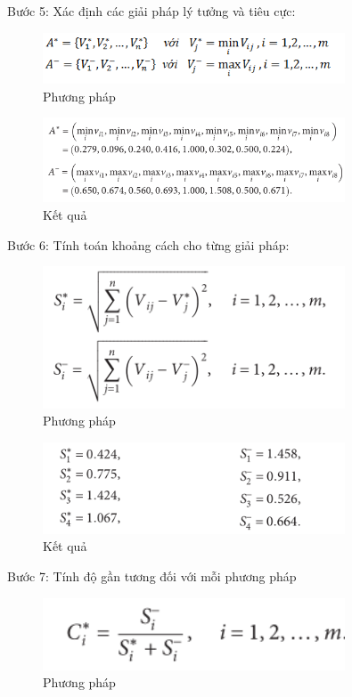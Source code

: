 \documentclass{article}
\begin{document}
Bước 5: Xác định các giải pháp lý tưởng và tiêu cực:
\begin{figure}[H]
    \centering
    \includegraphics[width=0.8\textwidth]{o15.png}
    \caption{Phương pháp}
    \label{dongco}
\end{figure}
\begin{figure}[H]
    \centering
    \includegraphics[width=0.8\textwidth]{o16.png}
    \caption{Kết quả}
    \label{dongco}
\end{figure}
Bước 6: Tính toán khoảng cách cho từng giải pháp:
\begin{figure}[H]
    \centering
    \includegraphics[width=0.8\textwidth]{o17.png}
    \caption{Phương pháp}
    \label{dongco}
\end{figure}
\begin{figure}[H]
    \centering
    \includegraphics[width=0.8\textwidth]{o18.png}
    \caption{Kết quả}
    \label{dongco}
\end{figure}
Bước 7: Tính độ gần tương đối với mỗi phương pháp
\begin{figure}[H]
    \centering
    \includegraphics[width=0.8\textwidth]{o19.png}
    \caption{Phương pháp}
    \label{dongco}
\end{figure}
\end{document}
